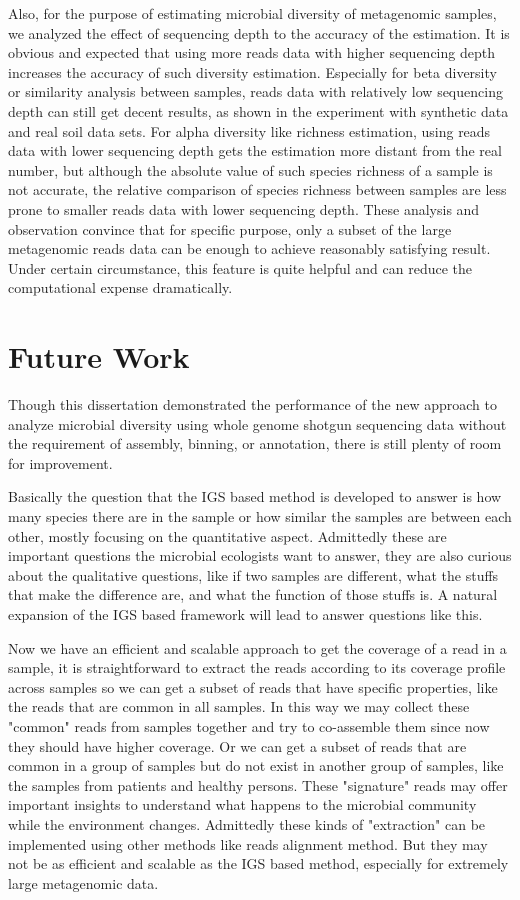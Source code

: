 Also, for the purpose of estimating microbial diversity of metagenomic samples,
we analyzed the effect of sequencing depth to the accuracy of the estimation.
It is obvious and expected that using more reads data with higher sequencing
depth increases the accuracy of such diversity estimation. Especially for beta
diversity or similarity analysis between samples, reads data with relatively
low sequencing depth can still get decent results, as shown in the experiment
with synthetic data and real soil data sets. For alpha diversity like richness
estimation, using reads data with lower sequencing depth gets the estimation
more distant from the real number, but although the absolute value of such species
richness of a sample is not accurate, the relative comparison of species
richness between samples are less prone to smaller reads data with lower
sequencing depth. These analysis and observation convince that for specific
purpose, only a subset of the large metagenomic reads data can be enough to
achieve reasonably satisfying result. Under certain circumstance, this feature
is quite helpful and can reduce the computational expense dramatically. 


\section{Future Work}


Though this dissertation demonstrated the performance of the new approach to 
analyze microbial diversity
using whole genome shotgun sequencing data without the requirement of assembly,
binning, or annotation, there is still plenty of room for improvement.  

Basically the question that the IGS based method is developed to answer is how many
species there are in the sample or how similar the samples are between each
other, mostly focusing on the quantitative aspect. Admittedly these are 
important questions the microbial ecologists want to answer, they are also
curious about the qualitative questions, like if two samples are different, what
the stuffs that make the difference are, and what  the function of
those stuffs is.\cite{Xu2014}  A natural expansion of the IGS based framework will lead to
answer questions like this. 

Now we have an efficient and scalable approach to get the coverage of a read in
a sample, it is straightforward to extract the reads according to its coverage
profile across samples so we can get a subset of reads that have specific
properties, like the reads that are common in all samples. In this way we
may collect these "common" reads from samples together and try to co-assemble
them since now they should have higher coverage. Or we can get a subset of
reads that are common in a group of samples but do not exist in another group
of samples, like the samples from patients and healthy persons. These
"signature" reads may offer important insights to understand what happens
to the microbial community while the environment changes. Admittedly these
kinds of "extraction" can be implemented using other methods like reads 
alignment method. But they may not be as efficient and scalable as the IGS
based method, especially for extremely large metagenomic data.


